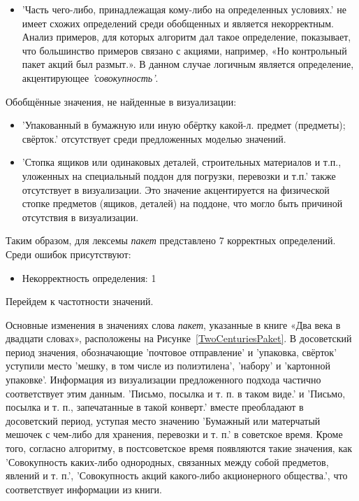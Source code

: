 \documentclass[LI,VKR]{HSEUniversity}
\begin{document}
\begin{itemize}
    \item ’Часть чего-либо, принадлежащая кому-либо на определенных условиях.’ не
имеет схожих определений среди обобщенных и является некорректным.
Анализ примеров, для которых алгоритм дал такое определение, показывает, что
большинство примеров связано с акциями, например, «Но контрольный пакет акций был размыт.».
В данном случае логичным является определение, акцентирующее \textit{’совокупность’}.
\end{itemize}

Обобщённые значения, не найденные в визуализации:
\begin{itemize}
    \item ’Упакованный в бумажную или иную обёртку какой-л. предмет (предметы); свёрток.’
отсутствует среди предложенных моделью значений.

    \item ’Стопка ящиков или одинаковых деталей, строительных материалов и т.п.,
уложенных на специальный поддон для погрузки, перевозки и т.п.’
также отсутствует в визуализации.
Это значение акцентируется на физической стопке предметов (ящиков, деталей) на поддоне,
что могло быть причиной отсутствия в визуализации.
\end{itemize}

Таким образом, для лексемы \textit{пакет} представлено 7 корректных определений.
Среди ошибок присутствуют:
\begin{itemize}
    \item Некорректность определения: 1
\end{itemize}

Перейдем к частотности значений.

Основные изменения в значениях слова \textit{пакет}, указанные в книге «Два века в двадцати словах»,
расположены на Рисунке~\ref{TwoCenturiesPaket}.
В досоветский период значения, обозначающие ’почтовое отправление’ и ’упаковка, свёрток’
уступили место ’мешку, в том числе из полиэтилена’, ’набору’ и ’картонной упаковке’.
Информация из визуализации предложенного подхода частично соответствует этим данным.
’Письмо, посылка и т. п. в таком виде.’ и ’Письмо, посылка и т. п., запечатанные в такой конверт.’
вместе преобладают в досоветский период, уступая место значению
’Бумажный или матерчатый мешочек с чем-либо для хранения, перевозки и т. п.’ в советское время.
Кроме того, согласно алгоритму, в постсоветское время появляются такие значения, как
’Совокупность каких-либо однородных, связанных между собой предметов, явлений и т. п.’,
’Совокупность акций какого-либо акционерного общества.’,
что соответствует информации из книги.
\end{document}
